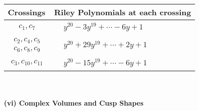 \documentclass[1p]{elsarticle_modified}
\theoremstyle{definition}
\begin{document}
\begin{tabular}{m{50pt}|m{274pt}}
Crossings & \hspace{64pt}Riley Polynomials at each crossing \\
\hline $$\begin{aligned}c_{1},c_{7}\end{aligned}$$&$\begin{aligned}
&y^{20}-3 y^{19}+\cdots-6 y+1
\end{aligned}$\\
\hline $$\begin{aligned}c_{2},c_{4},c_{5}\\c_{6},c_{8},c_{9}\end{aligned}$$&$\begin{aligned}
&y^{20}+29 y^{19}+\cdots+2 y+1
\end{aligned}$\\
\hline $$\begin{aligned}c_{3},c_{10},c_{11}\end{aligned}$$&$\begin{aligned}
&y^{20}-15 y^{19}+\cdots-6 y+1
\end{aligned}$\\
\hline
\end{tabular}\\~\\
\newpage\flushleft \textbf{(vi) Complex Volumes and Cusp Shapes}
\end{document}
